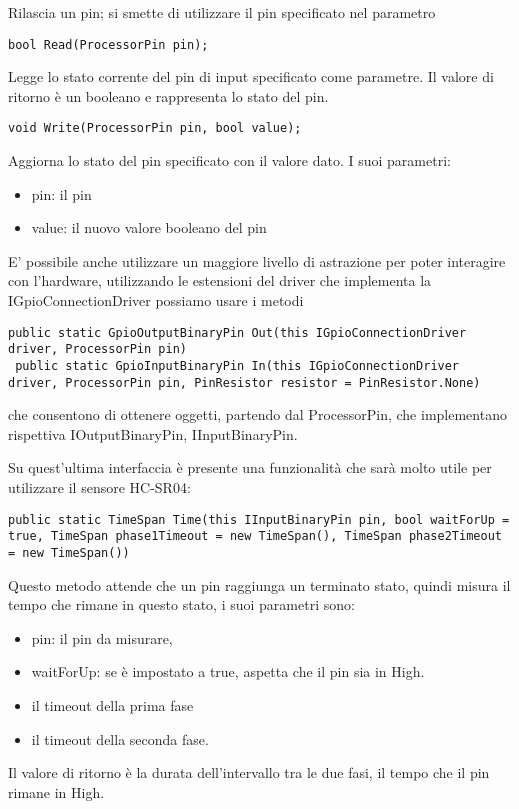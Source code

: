   Rilascia un pin; si smette di utilizzare il pin specificato nel parametro
 
   
 
      
  \begin{lstlisting}[frame=none]
   bool Read(ProcessorPin pin);
  \end{lstlisting}
  
   Legge lo stato corrente del pin di input specificato come parametre. Il valore di ritorno è un booleano e rappresenta lo stato del pin. 
  

\begin{lstlisting}[frame=none]
void Write(ProcessorPin pin, bool value);
\end{lstlisting}
Aggiorna lo stato del pin specificato con il valore dato. I suoi parametri:
\begin{itemize}
\item	pin: il pin
\item	value: il nuovo valore booleano del pin
\end{itemize}
 E' possibile anche utilizzare un maggiore livello di astrazione per poter interagire con l'hardware,
 utilizzando le estensioni del driver che implementa la IGpioConnectionDriver possiamo usare i metodi
   \begin{lstlisting}[frame=none]
 public static GpioOutputBinaryPin Out(this IGpioConnectionDriver driver, ProcessorPin pin)
 public static GpioInputBinaryPin In(this IGpioConnectionDriver driver, ProcessorPin pin, PinResistor resistor = PinResistor.None)
 \end{lstlisting}
che consentono di ottenere oggetti, partendo dal ProcessorPin, che implementano rispettiva IOutputBinaryPin, IInputBinaryPin.

Su quest'ultima interfaccia è presente una funzionalità che sarà molto utile per utilizzare il sensore HC-SR04:

\begin{lstlisting}[frame=none]
public static TimeSpan Time(this IInputBinaryPin pin, bool waitForUp = true, TimeSpan phase1Timeout = new TimeSpan(), TimeSpan phase2Timeout = new TimeSpan())

\end{lstlisting}
Questo metodo attende che un pin raggiunga un terminato stato, quindi misura il tempo che rimane in questo stato, i suoi parametri sono:
\begin{itemize}
	 \item pin: il pin da misurare,
	 \item waitForUp: se è impostato a true, aspetta che il pin sia in High.
	 \item il timeout della prima fase
	 \item il timeout della seconda fase.
\end{itemize}
Il valore di ritorno è la durata dell'intervallo tra le due fasi, il tempo che il pin rimane in High.
  

